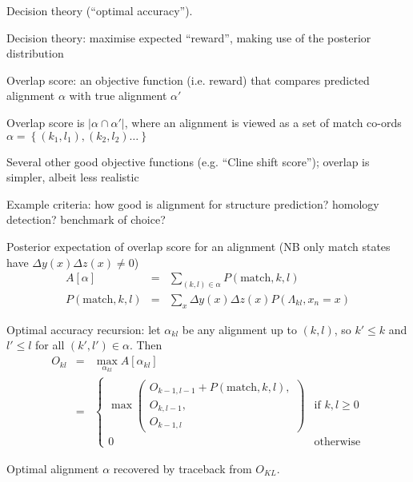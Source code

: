 \documentclass{beamer}
\begin{document}
\begin{frame}{}

Decision theory (``optimal accuracy'').
 \itemb
 \item Decision theory: maximise expected ``reward'', making use of the posterior distribution
 \item Overlap score: an objective function (i.e. reward) that compares predicted alignment $\alpha$ with true alignment $\alpha'$
  \itemb
  \item Overlap score is $|\alpha \cap \alpha'|$, where an alignment is viewed as a set of match co-ords $\alpha = \left\{ (k_1,l_1), (k_2,l_2) \ldots \right\}$
  \item Several other good objective functions (e.g. ``Cline shift score''); overlap is simpler, albeit less realistic
  \item Example criteria: how good is alignment for structure prediction? homology detection? benchmark of choice?
  \iteme
\iteme
\end{frame}

\begin{frame}{}
\itemb
 \item Posterior expectation of overlap score for an alignment (NB only match states have $\Delta y(x) \Delta z(x) \neq 0$)
\begin{eqnarray*}
A[\alpha] & = & \sum_{(k,l) \in \alpha} P(\mbox{match},k,l) \\
P(\mbox{match},k,l) & = & \sum_x \Delta y(x) \Delta z(x) P(\Lambda_{kl},x_n=x)
\end{eqnarray*}
\iteme
\end{frame}

\begin{frame}{}
\itemb
 \item Optimal accuracy recursion: let $\alpha_{kl}$ be any alignment up to $(k,l)$, so $k' \leq k$ and $l' \leq l$ for all $(k',l') \in \alpha$. Then
\begin{eqnarray*}
O_{kl} & = & \max_{\alpha_{kl}} A\left[ \alpha_{kl} \right] \\
& = & \left\{ \begin{array}{ll}
\max \left( \begin{array}{l} O_{k-1,l-1} + P(\mbox{match},k,l), \\ O_{k,l-1}, \\ O_{k-1,l} \end{array} \right) & \mbox{if $k,l \geq 0$} \\
0 & \mbox{otherwise}
\end{array} \right.
\end{eqnarray*}
 \item Optimal alignment $\alpha$ recovered by traceback from $O_{KL}$.
 \iteme

\end{frame}
\end{document}
